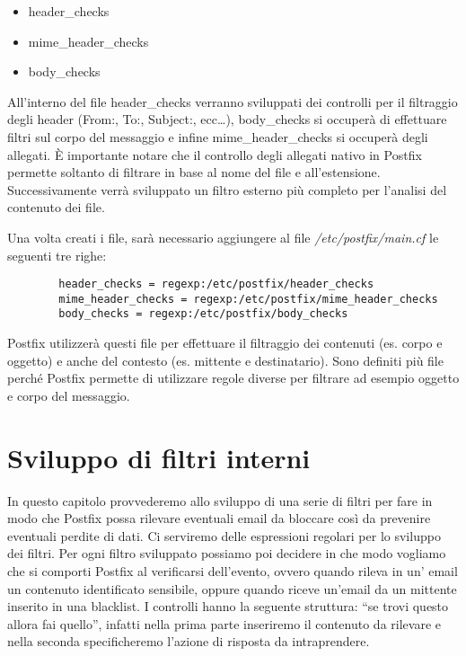    \begin{itemize}
        \item header\_checks
        \item mime\_header\_checks
        \item body\_checks
    \end{itemize}

    All'interno del file header\_checks verranno sviluppati dei controlli per il filtraggio degli header
    (From:, To:, Subject:, ecc\dots), body\_checks si occuperà di effettuare filtri sul corpo del messaggio e
    infine mime\_header\_checks si occuperà degli allegati. È importante notare che il controllo degli allegati
    nativo in Postfix permette soltanto di filtrare in base al nome del file e all'estensione. Successivamente 
    verrà sviluppato un filtro esterno più completo per l'analisi del contenuto dei file.

    Una volta creati i file, sarà necessario aggiungere al file \textit{/etc/postfix/main.cf} le seguenti tre righe:

    \begin{verbatim}
        header_checks = regexp:/etc/postfix/header_checks
        mime_header_checks = regexp:/etc/postfix/mime_header_checks
        body_checks = regexp:/etc/postfix/body_checks
    \end{verbatim}

    Postfix utilizzerà questi file per effettuare il filtraggio dei contenuti (es. corpo e oggetto) e anche del
    contesto (es. mittente e destinatario). Sono definiti più file perché Postfix permette di utilizzare regole 
    diverse per filtrare ad esempio oggetto e corpo del messaggio.

    \section{Sviluppo di filtri interni}
    In questo capitolo provvederemo allo sviluppo di una serie di filtri per fare in modo che Postfix possa 
    rilevare eventuali email da bloccare così da prevenire eventuali perdite di dati. 
    Ci serviremo delle espressioni regolari per lo sviluppo dei filtri. Per ogni filtro sviluppato possiamo 
    poi decidere in che modo vogliamo che si comporti Postfix al verificarsi dell’evento, 
    ovvero quando rileva in un’ email un contenuto identificato sensibile, oppure quando riceve un’email da un 
    mittente inserito in una blacklist.
    I controlli hanno la seguente struttura: “se trovi questo allora fai quello”, 
    infatti nella prima parte inseriremo il contenuto da rilevare e nella seconda specificheremo l’azione di 
    risposta da intraprendere.

